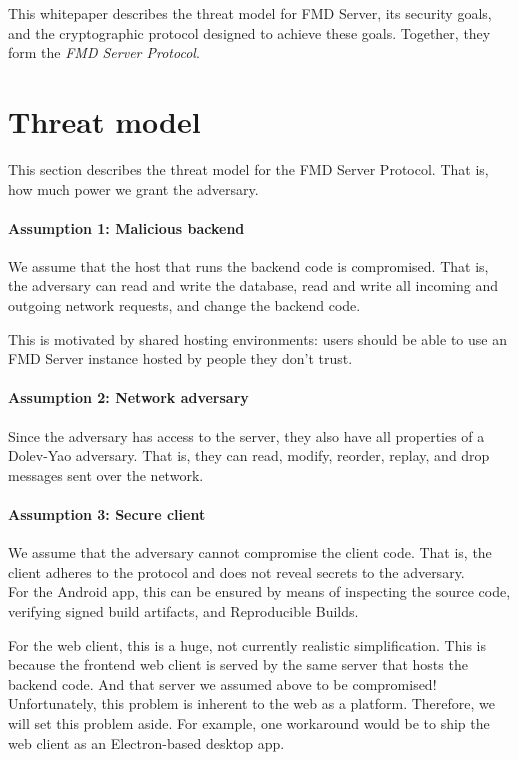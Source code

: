 \documentclass[11pt,a4paper]{article}
\begin{document}
This whitepaper describes the threat model for FMD Server, its security goals,
and the cryptographic protocol designed to achieve these goals.
Together, they form the \emph{FMD Server Protocol}.


\newpage

\section{Threat model} \label{sec:threat-model}

This section describes the threat model for the FMD Server Protocol.
That is, how much power we grant the adversary.

\paragraph{Assumption 1: Malicious backend}
We assume that the host that runs the backend code is compromised.
That is, the adversary can read and write the database,
read and write all incoming and outgoing network requests, and change the backend code.

This is motivated by shared hosting environments:
users should be able to use an FMD Server instance hosted by people they don't trust.

\paragraph{Assumption 2: Network adversary}
Since the adversary has access to the server, they also have all properties of a Dolev-Yao adversary.
That is, they can read, modify, reorder, replay, and drop messages sent over the network.

\paragraph{Assumption 3: Secure client}
We assume that the adversary cannot compromise the client code.
That is, the client adheres to the protocol and does not reveal secrets to the adversary.
\\

For the Android app, this can be ensured by means of inspecting the source code,
verifying signed build artifacts, and Reproducible Builds.

For the web client, this is a huge, not currently realistic simplification.
This is because the frontend web client is served by the same server that hosts the backend code.
And that server we assumed above to be compromised!
Unfortunately, this problem is inherent to the web as a platform.
Therefore, we will set this problem aside.
For example, one workaround would be to ship the web client as an Electron-based desktop app.
\\
\end{document}
